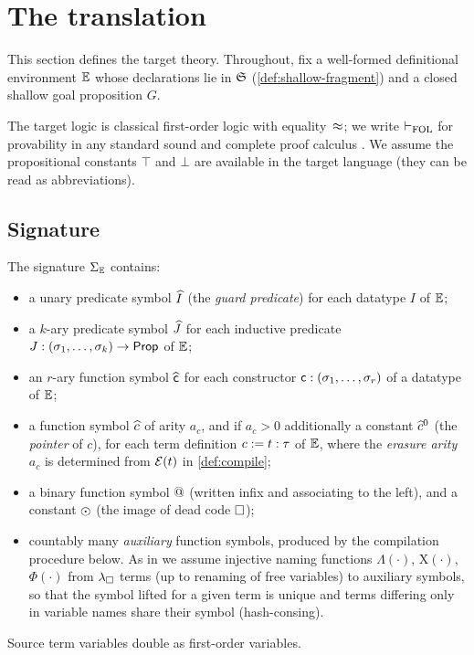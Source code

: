 \section{The translation}
\label{sec:translation}

This section defines the target theory.  Throughout, fix a well-formed
definitional environment $\mathbb{E}$ whose declarations lie in $\mathfrak{S}$
(\cref{def:shallow-fragment}) and a closed shallow goal proposition $G$.

The target logic is classical first-order logic with equality~$\approx$; we
write $\vdash_{\mathrm{FOL}}$ for provability in any standard sound and complete
proof calculus \cite{Shoenfield1967}.  We assume the propositional
constants $\top$ and $\bot$ are available in the target language (they can
be read as abbreviations).

\subsection{Signature}
\label{sec:translation-sig}

\begin{definition}
\label{def:signature}
The signature $\Sigma_{\mathbb{E}}$ contains:
\begin{itemize}[leftmargin=2em]
\item a unary predicate symbol $\widehat{I}$ (the \emph{guard predicate}) for
  each datatype $I$ of $\mathbb{E}$;
\item a $k$-ary predicate symbol $\widehat{J}$ for each inductive predicate
  $J : (\sigma_1, \dots, \sigma_k) \to \mathsf{Prop}$ of $\mathbb{E}$;
\item an $r$-ary function symbol $\widehat{\mathsf{c}}$ for each constructor
  $\mathsf{c} : (\sigma_1, \dots, \sigma_r)$ of a datatype of $\mathbb{E}$;
\item a function symbol $\widehat{c}$ of arity $a_c$, and if $a_c > 0$
  additionally a constant $\widehat{c}^0$ (the \emph{pointer} of $c$), for
  each term definition $c \mathrel{:=} t : \tau$ of $\mathbb{E}$, where the
  \emph{erasure arity} $a_c$ is determined from $\mathcal{E}(t)$ in
  \cref{def:compile};
\item a binary function symbol $\mathbin{@}$ (written infix and associating to
  the left), and a constant $\odot$ (the image of dead code $\square$);
\item countably many \emph{auxiliary} function symbols, produced by the
  compilation procedure below.  As in \cite[\S 4]{Czajka2018} we assume
  injective naming functions $\Lambda(\cdot)$, $\mathrm{X}(\cdot)$,
  $\Phi(\cdot)$ from $\lambda_{\square}$ terms (up to renaming of free variables) to
  auxiliary symbols, so that the symbol lifted for a given term is unique
  and terms differing only in variable names share their symbol
  (hash-consing).
\end{itemize}
Source term variables double as first-order variables.
\end{definition}

